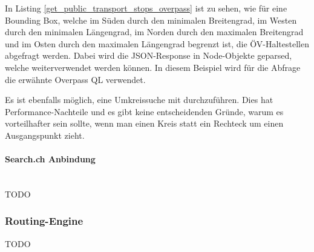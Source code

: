 In Listing \ref{get_public_transport_stops_overpass} ist zu sehen, wie für eine Bounding Box, welche im Süden durch den minimalen Breitengrad, im Westen durch den minimalen Längengrad, im Norden durch den maximalen Breitengrad und im Osten durch den maximalen Längengrad begrenzt ist, die ÖV-Haltestellen abgefragt werden. Dabei wird die JSON-Response in Node-Objekte geparsed, welche weiterverwendet werden können. In diesem Beispiel wird für die Abfrage die erwähnte Overpass QL verwendet.

Es ist ebenfalls möglich, eine Umkreissuche mit  durchzuführen. Dies hat Performance-Nachteile und es gibt keine entscheidenden Gründe, warum es vorteilhafter sein sollte, wenn man einen Kreis statt ein Rechteck um einen Ausgangspunkt zieht.

\paragraph{Search.ch Anbindung}\label{architektur:Search.ch Anbindung}~\\

TODO

\subsubsection{Routing-Engine}
\label{architektur:Routing-Engine}

TODO
